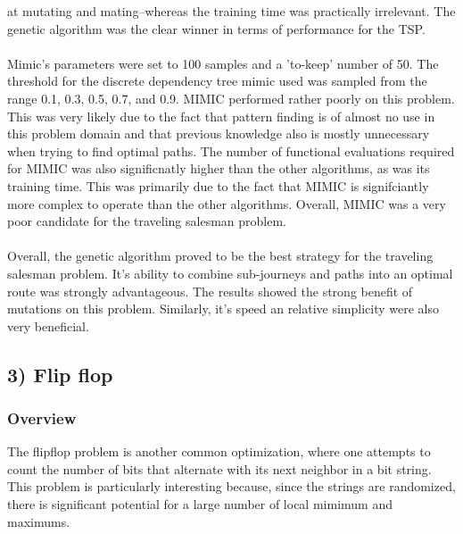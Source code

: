 \documentclass[h]{article}
\begin{document}
at mutating and mating--whereas the training time was practically irrelevant.  
The genetic algorithm was the clear winner in terms of performance for the TSP.
\\ \\
Mimic's parameters were set to 100 samples and a 'to-keep' number of 50.  
The threshold for the discrete dependency tree mimic used was sampled from the 
range 0.1, 0.3, 0.5, 0.7, and 0.9.  MIMIC performed rather poorly on this problem.  This was very likely due to the fact that pattern finding is of almost no use in this 
problem domain and that previous knowledge also is mostly unnecessary when trying to find optimal paths.  The number of functional 
evaluations required for MIMIC was also significnatly higher than the other 
algorithms, as was its training time.  This was primarily due to the fact that 
MIMIC is signifciantly more complex to operate than the other algorithms.  
Overall, MIMIC was a very poor candidate for the traveling salesman problem.
\\ \\
Overall, the genetic algorithm proved to be the best strategy for the traveling salesman problem.  It's ability to combine 
sub-journeys and paths into an optimal route was strongly advantageous.  The results showed the strong benefit of mutations on this 
problem.  Similarly, it's speed an relative simplicity were also very 
beneficial.

\subsection*{3) Flip flop}  
\subsubsection*{Overview}
The flipflop problem is another common optimization, where one attempts to 
count the number of bits that alternate with its next neighbor in a bit string.  
This problem is particularly interesting because, since the strings are 
randomized, there is significant potential for a large number of local mimimum 
and maximums.
\end{document}
